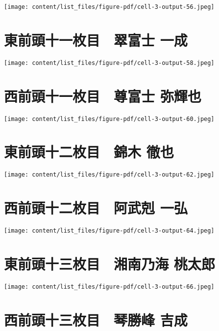 \documentclass[
  letterpaper,
]{bxjsbook}
\begin{document}
\texttt{[image: content/list\_files/figure-pdf/cell-3-output-56.jpeg]}

\section{東前頭十一枚目　翠富士
一成}\label{ux6771ux524dux982dux5341ux4e00ux679aux76ee-ux7fe0ux5bccux58eb-ux4e00ux6210}

\texttt{[image: content/list\_files/figure-pdf/cell-3-output-58.jpeg]}

\section{西前頭十一枚目　尊富士
弥輝也}\label{ux897fux524dux982dux5341ux4e00ux679aux76ee-ux5c0aux5bccux58eb-ux5f25ux8f1dux4e5f}

\texttt{[image: content/list\_files/figure-pdf/cell-3-output-60.jpeg]}

\section{東前頭十二枚目　錦木
徹也}\label{ux6771ux524dux982dux5341ux4e8cux679aux76ee-ux9326ux6728-ux5fb9ux4e5f}

\texttt{[image: content/list\_files/figure-pdf/cell-3-output-62.jpeg]}

\section{西前頭十二枚目　阿武剋
一弘}\label{ux897fux524dux982dux5341ux4e8cux679aux76ee-ux963fux6b66ux524b-ux4e00ux5f18}

\texttt{[image: content/list\_files/figure-pdf/cell-3-output-64.jpeg]}

\section{東前頭十三枚目　湘南乃海
桃太郎}\label{ux6771ux524dux982dux5341ux4e09ux679aux76ee-ux6e58ux5357ux4e43ux6d77-ux6843ux592aux90ce}

\texttt{[image: content/list\_files/figure-pdf/cell-3-output-66.jpeg]}

\section{西前頭十三枚目　琴勝峰
吉成}\label{ux897fux524dux982dux5341ux4e09ux679aux76ee-ux7434ux52ddux5cf0-ux5409ux6210}
\end{document}

